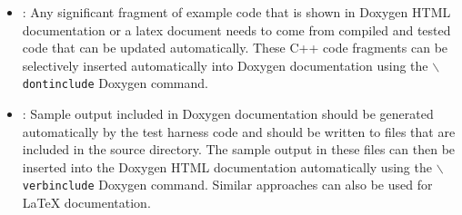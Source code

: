 \begin{itemize}
{\begin{verbatim}
    ...

  };

\end{verbatim}}


\item\DOXAutogenerateExampleCode: Any significant fragment of example
  code that is shown in Doxygen HTML documentation or a latex document
  needs to come from compiled and tested code that can be updated
  automatically.  These C++ code fragments can be selectively inserted
  automatically into Doxygen documentation using the
  \texttt{$\backslash$dontinclude} Doxygen command.


\item\DOXAutogenerateSampleOutput: Sample output included in Doxygen
  documentation should be generated automatically by the test harness
  code and should be written to files that are included in the source
  directory.  The sample output in these files can then be inserted
  into the Doxygen HTML documentation automatically using the
  \texttt{$\backslash$verbinclude} Doxygen command.  Similar
  approaches can also be used for \LaTeX{} documentation.


\end{itemize}
